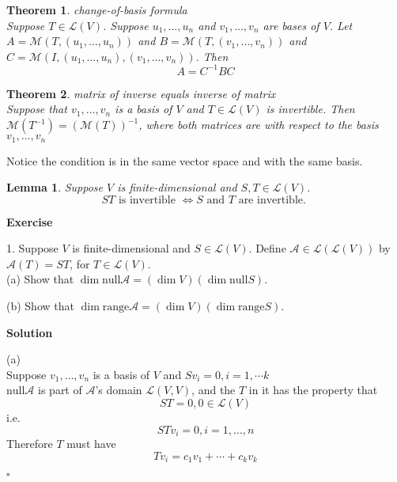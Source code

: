 \documentclass{article}
\newtheorem{theorem}{Theorem}[subsection]
\newtheorem{lemma}{Lemma}[subsection]
\newenvironment{exercise}{%
{\textbf{Exercise\\}
    }
}{
}
\newenvironment{solution}{%
{
    \textbf{Solution\\}
    }
}{
  \hfill $\square$ 
  \par\bigskip 
}
\newcommand{\n}{\text{null}}
\begin{document}
\begin{CJK}{UTF8}{gkai}
\begin{theorem}
    change-of-basis formula\\
    
    Suppose $T \in \mathcal{L}(V)$. Suppose $u_1,\ldots,u_n$ and $v_1,\ldots,v_n $ are bases of $V$. Let $A = \mathcal{M}(T,(u_1,\ldots,u_n))$ and $B = \mathcal{M}(T,(v_1,\ldots,v_n))$ and $C = \mathcal{M}(I,(u_1,\ldots,u_n),(v_1,\ldots,v_n))$. Then
    \[A =C^{-1}BC\]
    
\end{theorem}

\begin{theorem}
    matrix of inverse equals inverse of matrix\\

    Suppose that $v_1,\ldots,v_n$ is a basis of $V$ and $T \in \mathcal{L}(V)$ is invertible. Then $\mathcal{M}(T^{-1}) = ( \mathcal{M} (T) )^{-1}$, where both matrices are with respect to the basis $v_1,\ldots,v_n$\\
\end{theorem}

Notice the condition is in the same vector space and with the same basis.\\

\begin{lemma}
    Suppose $V$ is finite-dimensional and $S,T \in \mathcal{L}(V)$.
 \[ST \text{~is invertible~} \Leftrightarrow S \text{~and~} T \text{~are invertible.~}\]
\end{lemma}

\begin{exercise}
1. Suppose $V$ is finite-dimensional and $S \in \mathcal{L}(V)$. Define $\mathcal{A} \in \mathcal{L}(\mathcal{L}(V))$ by $\mathcal{A}(T) = ST$, for $T \in \mathcal{L}(V)$.\\

(a) Show that $\dim \text{null}\mathcal{A} = (\dim V)(\dim \text{null}S)$.

(b) Show that $\dim \text{range}\mathcal{A} = (\dim V)(\dim \text{range} S)$.\\
\end{exercise}

\begin{solution}
(a)\\

Suppose $v_1,\ldots , v_n$ is a basis of $V$ and $Sv_i = 0, i = 1, \cdots k$\\

$\n \mathcal{A}$ is part of $\mathcal{A}$'s domain $\mathcal{L}(V,V)$, and the $T$ in it has the property that
\[ST = 0, 0 \in \mathcal{L}(V)\]
i.e.
\[ST v_i = 0, i = 1,\ldots,n\]
Therefore $T$ must have
\[Tv_i = c_1 v_1 + \cdots + c_k v_k\]


\end{solution}
\end{CJK}
\end{document}
